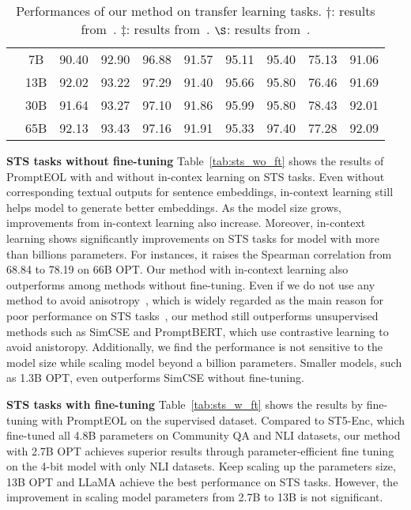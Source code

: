 \documentclass{article}
\begin{document}
\begin{table*}[t]
{\begin{tabular}{lccccccccc}
& 7B & 90.40 & 92.90 & 96.88 & 91.57 & 95.11 & 95.40 & 75.13 & 91.06 \\
& 13B & 92.02 & 93.22 & 97.29 & 91.40 & 95.66 & 95.80 & 76.46 & 91.69 \\
& 30B & 91.64 & 93.27 & 97.10 & 91.86 & 95.99 & 95.80 & 78.43 & 92.01 \\
& 65B\cellcolor{lightcyan} & 92.13\cellcolor{lightcyan} & 93.43\cellcolor{lightcyan} & 97.16\cellcolor{lightcyan} & 91.91\cellcolor{lightcyan} & 95.33\cellcolor{lightcyan} & 97.40\cellcolor{lightcyan} & 77.28\cellcolor{lightcyan} & 92.09\cellcolor{lightcyan} \\
\bottomrule
\end{tabular}}
\caption{ Performances of our method on transfer learning tasks.
  \(\dagger\): results from~\cite{gao2021simcse}.
  \(\ddagger \): results from~\cite{jiang2022promptbert}.
  \(\S\): results from~\cite{sentencet5}.
}\label{tab:tran_w_ft}
\vspace{-15pt}
\end{table*}

\textbf{STS tasks without fine-tuning}
Table~\ref{tab:sts_wo_ft} shows the results of PromptEOL with and without in-contex learning on STS tasks.
Even without corresponding textual outputs for sentence embeddings, in-context learning still helps model to generate better embeddings.
As the model size grows, improvements from in-context learning also increase.
Moreover, in-context learning shows significantly improvements on STS tasks for model with more than billions parameters.
For instances, it raises the Spearman correlation from 68.84 to 78.19 on 66B OPT.
Our method with in-context learning also outperforms among methods without fine-tuning.
Even if we do not use any method to avoid anisotropy~\cite{ethayarajh2019contextual}, which is widely regarded as the main reason for poor performance on STS tasks~\cite{gao2021simcse, sentencet5}, our method still outperforms unsupervised methods such as SimCSE and PromptBERT, which use contrastive learning to avoid anistoropy.
Additionally, we find the performance is not sensitive to the model size while scaling model beyond a billion parameters.
Smaller models, such as 1.3B OPT, even outperforms SimCSE without fine-tuning.

\textbf{STS tasks with fine-tuning}
Table~\ref{tab:sts_w_ft} shows the results by fine-tuning with PromptEOL on the supervised dataset.
Compared to ST5-Enc, which fine-tuned all 4.8B parameters on Community QA and NLI datasets,
our method with 2.7B OPT achieves superior results through parameter-efficient fine tuning on the 4-bit model with only NLI datasets.
Keep scaling up the parameters size, 13B OPT and LLaMA achieve the best performance on STS tasks.
However, the improvement in scaling model parameters from 2.7B to 13B is not significant.
\end{document}
